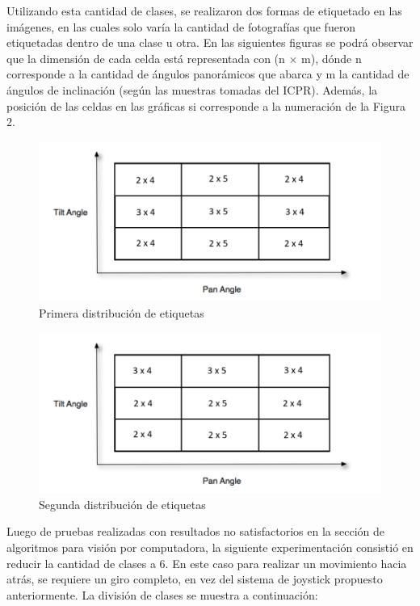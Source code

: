 Utilizando esta cantidad de clases, se realizaron dos formas de etiquetado en las imágenes, en las cuales solo varía la cantidad de fotografías que fueron etiquetadas dentro de una clase u otra. En las siguientes figuras se podrá observar que la dimensión de cada celda está representada con (n $\times$ m), dónde n corresponde a la cantidad de ángulos panorámicos que abarca y m la cantidad de ángulos de inclinación (según las muestras tomadas del ICPR). Además, la posición de las celdas en las gráficas si corresponde a la numeración de la Figura 2.


\begin{figure}[H]
	\centering
	\includegraphics[scale=1]{figures/clasi01.png}
	\caption{Primera distribución de etiquetas}
	\label{fig:img4}
\end{figure}

\begin{figure}[H]
	\centering
	\includegraphics[scale=1]{figures/clasi02.png}
	\caption{Segunda distribución de etiquetas}
	\label{fig:img5}
\end{figure}

Luego de pruebas realizadas con resultados no satisfactorios en la sección de algoritmos para visión por computadora, la siguiente experimentación consistió en reducir la cantidad de clases a 6. En este caso para realizar un movimiento hacia atrás, se requiere un giro completo, en vez del sistema de joystick propuesto anteriormente. La división de clases se muestra a continuación:

